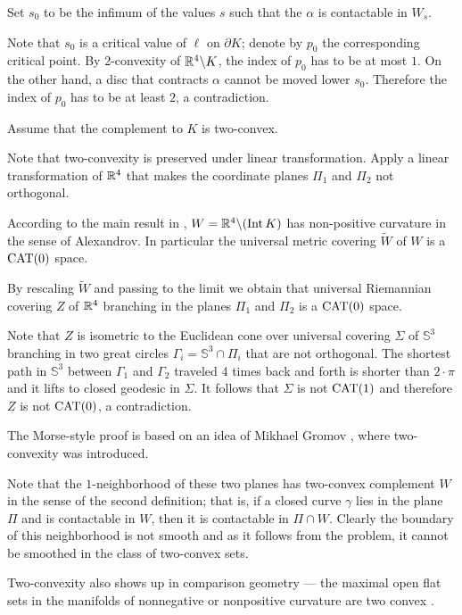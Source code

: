 Set $s_0$ to be the infimum of the values $s$ such that
the $\alpha$ is contactable in $W_s$.

Note that $s_0$ is a critical value of $\ell$ on $\partial K$;
denote by $p_0$ the corresponding critical point.
By 2-convexity of $\mathbb{R}^4\backslash K$,
the index of $p_0$ has to be at most $1$.
On the other hand, a disc that contracts $\alpha$ cannot be moved lower $s_0$.
Therefore the index of $p_0$ has to be at least $2$, a contradiction.
\qeds

Assume that the complement to $K$ is two-convex.

Note that two-convexity is preserved under linear transformation.
Apply a linear transformation of $\mathbb{R}^4$ that makes the coordinate planes $\Pi_1$ and $\Pi_2$ not orthogonal.

According to the main result in \cite{ABB}, $W\z=\RR^4\backslash (\Int K)$ has non-positive curvature in the sense of Alexandrov.
In particular the universal metric covering $\tilde W$ of $W$ is a $\operatorname{\rm CAT}\nolimits(0)$ space.

By rescaling $\tilde W$ and passing to the limit we obtain that universal Riemannian covering $Z$ of $\mathbb{R}^4$ branching in the planes $\Pi_1$ and $\Pi_2$ is a $\operatorname{\rm CAT}\nolimits(0)$ space.

Note that $Z$ is isometric to the Euclidean cone over universal covering $\Sigma$ of $\mathbb{S}^3$ branching in two great circles $\Gamma_i=\mathbb{S}^3\cap \Pi_i$ that are not orthogonal.
The shortest path in $\mathbb{S}^3$ between $\Gamma_1$ and $\Gamma_2$ traveled 4 times back and forth is shorter than $2\cdot\pi$ and it lifts to closed geodesic in $\Sigma$.
It follows that $\Sigma$ is not $\operatorname{\rm CAT}\nolimits(1)$ and therefore $Z$ is not $\operatorname{\rm CAT}\nolimits(0)$, a contradiction.\qeds

The Morse-style proof is based on an idea of Mikhael Gromov \cite[see \S\textonehalf{} in][]{gromov-SGMC}, where two-convexity was introduced.

Note that the $1$-neighborhood of these two planes has two-convex complement $W$ in the sense of the second definition;
that is, if a closed curve $\gamma$ lies in the plane $\Pi$
and is contactable in $W$, then it is contactable in $\Pi\cap W$.
Clearly the boundary of this neighborhood is not smooth
and as it follows from the problem, it cannot be smoothed in the class of two-convex sets. 

Two-convexity also shows up in comparison geometry --- the maximal open flat sets in the manifolds of nonnegative or nonpositive curvature are two convex \cite{panov-petrunin}.

